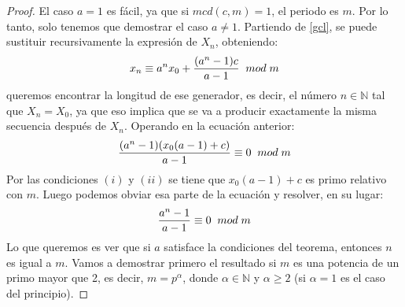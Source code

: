 \begin{proof}
El caso $a=1$ es fácil, ya que si $mcd(c,m)=1$, el periodo es $m$. Por lo tanto, solo tenemos que demostrar el caso $a\neq 1$. Partiendo de \eqref{gcl}, se puede sustituir recursivamente la expresión de $X_n$, obteniendo:
\[
x_n \equiv a^nx_0+\frac{(a^n-1)c}{a-1} \;\;mod \; m
\]
queremos encontrar la longitud de ese generador, es decir, el número $n\in\mathbb{N}$ tal que $X_n=X_0$, ya que eso implica que se va a producir exactamente la misma secuencia después de $X_n$. Operando en la ecuación anterior:
\[
\frac{(a^n-1)(x_0(a-1)+c)}{a-1} \equiv 0 \;\;mod \; m
\]
Por las condiciones $(i)$ y $(ii)$ se tiene que $x_0(a-1)+c$ es primo relativo con $m$. Luego podemos obviar esa parte de la ecuación y resolver, en su lugar:
\begin{equation}\label{eq:gcl2}
\frac{a^n-1}{a-1} \equiv 0 \;\;mod \; m
\end{equation}
Lo que queremos es ver que si $a$ satisface la condiciones del teorema, entonces $n$ es igual a $m$. Vamos a demostrar primero el resultado si $m$ es una potencia de un primo mayor que 2, es decir, $m=p^\alpha$, donde $\alpha\in\mathbb{N}$ y $\alpha\geq 2$ (si $\alpha=1$ es el caso del principio).


\end{proof}

